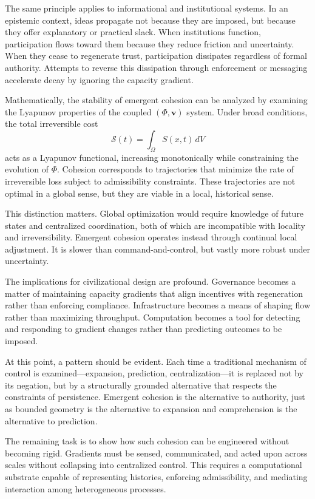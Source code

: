 \documentclass[12pt,oneside]{book}
\begin{document}
The same principle applies to informational and institutional systems. In an epistemic context, ideas propagate not because they are imposed, but because they offer explanatory or practical slack. When institutions function, participation flows toward them because they reduce friction and uncertainty. When they cease to regenerate trust, participation dissipates regardless of formal authority. Attempts to reverse this dissipation through enforcement or messaging accelerate decay by ignoring the capacity gradient.

Mathematically, the stability of emergent cohesion can be analyzed by examining the Lyapunov properties of the coupled \((\Phi, \mathbf{v})\) system. Under broad conditions, the total irreversible cost
\[
\mathcal{S}(t) = \int_{\Omega} S(x,t)\, dV
\]
acts as a Lyapunov functional, increasing monotonically while constraining the evolution of \(\Phi\). Cohesion corresponds to trajectories that minimize the rate of irreversible loss subject to admissibility constraints. These trajectories are not optimal in a global sense, but they are viable in a local, historical sense.

This distinction matters. Global optimization would require knowledge of future states and centralized coordination, both of which are incompatible with locality and irreversibility. Emergent cohesion operates instead through continual local adjustment. It is slower than command-and-control, but vastly more robust under uncertainty.

The implications for civilizational design are profound. Governance becomes a matter of maintaining capacity gradients that align incentives with regeneration rather than enforcing compliance. Infrastructure becomes a means of shaping flow rather than maximizing throughput. Computation becomes a tool for detecting and responding to gradient changes rather than predicting outcomes to be imposed.

At this point, a pattern should be evident. Each time a traditional mechanism of control is examined—expansion, prediction, centralization—it is replaced not by its negation, but by a structurally grounded alternative that respects the constraints of persistence. Emergent cohesion is the alternative to authority, just as bounded geometry is the alternative to expansion and comprehension is the alternative to prediction.

The remaining task is to show how such cohesion can be engineered without becoming rigid. Gradients must be sensed, communicated, and acted upon across scales without collapsing into centralized control. This requires a computational substrate capable of representing histories, enforcing admissibility, and mediating interaction among heterogeneous processes.
\end{document}

